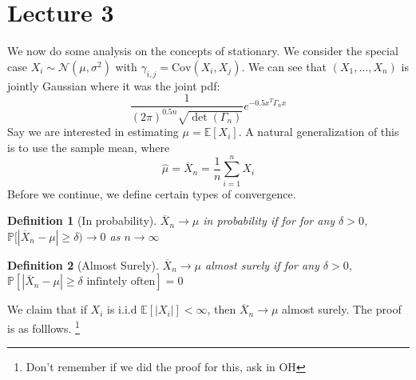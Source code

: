 \documentclass[12pt]{article}
\newtheorem{definition}{Definition}
\newcommand{\fP}{\mathbb{P}}
\newcommand{\E}{\mathbb{E}}
\newcommand{\Cov}{\text{Cov}}
\begin{document}
\section{Lecture 3}
We now do some analysis on the concepts of stationary. We consider the special case $X_i \sim \mathcal{N}(\mu,\sigma^2)$ with $\gamma_{i,j} = \Cov(X_i, X_j)$. We can see that $(X_1, \dots, X_n)$ is jointly Gaussian where it was the joint pdf:
\[
	\frac{1}{(2\pi)^{0.5n} \sqrt{\det(\Gamma_n)}}e^{-0.5x^T\Gamma_nx}
\]
Say we are interested in estimating $\mu = \E[X_i]$. A natural generalization of this is to use the sample mean, where 
\[
	\hat{\mu} = \overline{X}_n = \frac{1}{n}\sum_{i = 1}^n X_i
\]
Before we continue, we define certain types of convergence. 
\begin{definition}[In probability]
	$\overline{X}_n \to \mu$ in probability if for for any $\delta > 0$, $\fP[|\overline{X}_n - \mu| \geq \delta) \to 0$ as $n \to \infty$
\end{definition}
\begin{definition}[Almost Surely]
	$\overline{X}_n \to \mu$ almost surely if for any $\delta > 0$, $\fP[|\overline{X}_n - \mu| \geq \delta \text{ infintely often}] = 0$
\end{definition}
\noindent
We claim that if $X_i$ is i.i.d $\E[|X_i|] < \infty$, then $\overline{X}_n \to \mu$ almost surely. The proof is as folllows. \footnote{Don't remember if we did the proof for this, ask in OH}
\end{document}
